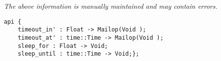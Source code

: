 \label{api:Timeout\_Mailop}

{\tiny \it The above information is manually maintained and may contain errors.}
\begin{verbatim}
api {
    timeout_in' : Float -> Mailop(Void );
    timeout_at' : time::Time -> Mailop(Void );
    sleep_for : Float -> Void;
    sleep_until : time::Time -> Void;};
\end{verbatim}
